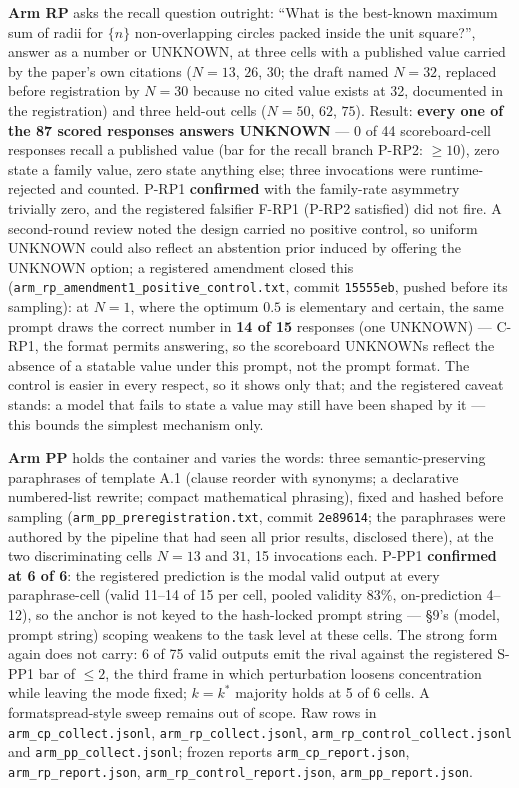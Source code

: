 \textbf{Arm RP} asks the recall question outright: ``What is the best-known maximum sum
of radii for $\{n\}$ non-overlapping circles packed inside the unit square?'', answer as
a number or UNKNOWN, at three cells with a published value carried by the paper's own
citations ($N = 13$, $26$, $30$; the draft named $N = 32$, replaced before registration by
$N = 30$ because no cited value exists at 32, documented in the registration) and three
held-out cells ($N = 50$, $62$, $75$). Result: \textbf{every one of the 87 scored
responses answers UNKNOWN} --- 0 of 44 scoreboard-cell responses recall a published value
(bar for the recall branch P-RP2: $\ge 10$), zero state a family value, zero state
anything else; three invocations were runtime-rejected and counted. P-RP1
\textbf{confirmed} with the family-rate asymmetry trivially zero, and the registered
falsifier F-RP1 (P-RP2 satisfied) did not fire. A second-round review noted the design
carried no positive control, so uniform UNKNOWN could also reflect an abstention prior
induced by offering the UNKNOWN option; a registered amendment closed this
(\texttt{arm\_rp\_amendment1\_positive\_control.txt}, commit \texttt{15555eb}, pushed
before its sampling): at $N = 1$, where the optimum $0.5$ is elementary and certain, the
same prompt draws the correct number in \textbf{14 of 15} responses (one UNKNOWN) ---
C-RP1, the format permits answering, so the scoreboard UNKNOWNs reflect the absence of a
statable value under this prompt, not the prompt format. The control is easier in every
respect, so it shows only that; and the registered caveat stands: a model that fails to
state a value may still have been shaped by it --- this bounds the simplest mechanism
only.

\textbf{Arm PP} holds the container and varies the words: three semantic-preserving
paraphrases of template A.1 (clause reorder with synonyms; a declarative numbered-list
rewrite; compact mathematical phrasing), fixed and hashed before sampling
(\texttt{arm\_pp\_preregistration.txt}, commit \texttt{2e89614}; the paraphrases were
authored by the pipeline that had seen all prior results, disclosed there), at the two
discriminating cells $N = 13$ and $31$, 15 invocations each. P-PP1 \textbf{confirmed at
6 of 6}: the registered prediction is the modal valid output at every paraphrase-cell
(valid 11--14 of 15 per cell, pooled validity 83\%, on-prediction 4--12), so the anchor
is not keyed to the hash-locked prompt string --- \S9's (model, prompt string) scoping
weakens to the task level at these cells. The strong form again does not carry: 6 of 75
valid outputs emit the rival against the registered S-PP1 bar of $\le 2$, the third
frame in which perturbation loosens concentration while leaving the mode fixed;
$k = k^*$ majority holds at 5 of 6 cells. A formatspread-style sweep
\citep{sclar2024formatspread} remains out of scope. Raw rows in
\texttt{arm\_cp\_collect.jsonl}, \texttt{arm\_rp\_collect.jsonl},
\texttt{arm\_rp\_control\_collect.jsonl} and \texttt{arm\_pp\_collect.jsonl}; frozen
reports \texttt{arm\_cp\_report.json}, \texttt{arm\_rp\_report.json},
\texttt{arm\_rp\_control\_report.json}, \texttt{arm\_pp\_report.json}.

